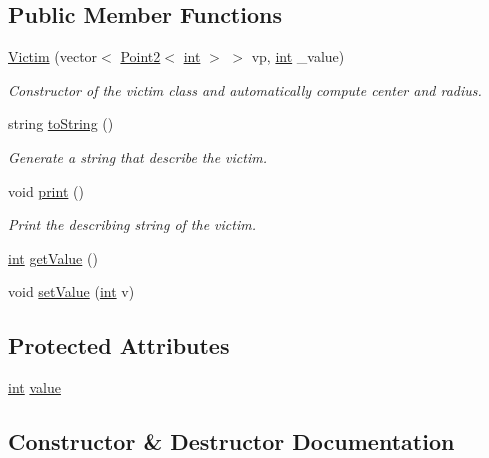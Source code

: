 \subsection*{Public Member Functions}
\begin{DoxyCompactItemize}
\item 
\mbox{\hyperlink{class_victim_aa637ce2011adf54f82387691116f7995}{Victim}} (vector$<$ \mbox{\hyperlink{class_point2}{Point2}}$<$ \mbox{\hyperlink{draw_8hh_aa620a13339ac3a1177c86edc549fda9b}{int}} $>$ $>$ vp, \mbox{\hyperlink{draw_8hh_aa620a13339ac3a1177c86edc549fda9b}{int}} \+\_\+value)
\begin{DoxyCompactList}\small\item\em Constructor of the victim class and automatically compute center and radius. \end{DoxyCompactList}\item 
string \mbox{\hyperlink{class_victim_aaedbd4e32daf061d175b1550aa8456ae}{to\+String}} ()
\begin{DoxyCompactList}\small\item\em Generate a string that describe the victim. \end{DoxyCompactList}\item 
void \mbox{\hyperlink{class_victim_a432fa2051a52fa66ba84170f4b822b91}{print}} ()
\begin{DoxyCompactList}\small\item\em Print the describing string of the victim. \end{DoxyCompactList}\item 
\mbox{\hyperlink{draw_8hh_aa620a13339ac3a1177c86edc549fda9b}{int}} \mbox{\hyperlink{class_victim_af5536f96053aafe5a79cf6964224c664}{get\+Value}} ()
\item 
void \mbox{\hyperlink{class_victim_acb5121882a5728e2c4bb89b0f8ef6a8f}{set\+Value}} (\mbox{\hyperlink{draw_8hh_aa620a13339ac3a1177c86edc549fda9b}{int}} v)
\end{DoxyCompactItemize}
\subsection*{Protected Attributes}
\begin{DoxyCompactItemize}
\item 
\mbox{\hyperlink{draw_8hh_aa620a13339ac3a1177c86edc549fda9b}{int}} \mbox{\hyperlink{class_victim_aaf8d0993ea6201011a4a1a597dc2de2e}{value}}
\end{DoxyCompactItemize}


\subsection{Constructor \& Destructor Documentation}
\mbox{\label{class_victim_aa637ce2011adf54f82387691116f7995}} 
